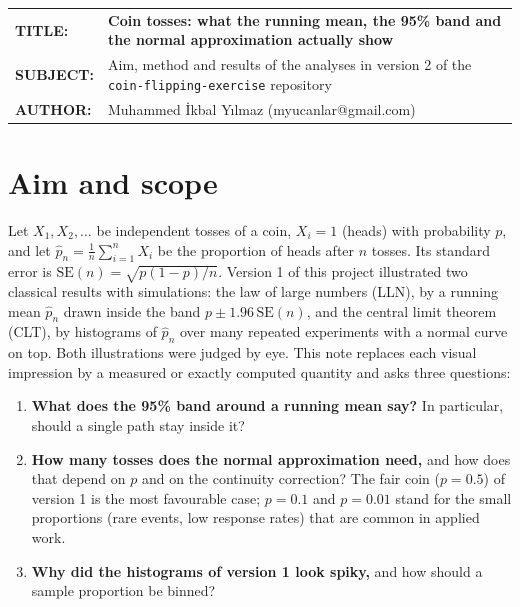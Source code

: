 \documentclass[11pt,a4paper]{article}
\begin{document}
\vspace*{14pt}
\begin{tabular}{@{}p{2.35cm}@{}p{\dimexpr\textwidth-2.35cm}@{}}
\textbf{TITLE:} & \textbf{\large Coin tosses: what the running mean, the 95\% band and the normal approximation actually show}\\[3pt]
\textbf{SUBJECT:} & Aim, method and results of the analyses in version 2 of the \texttt{coin-flipping-exercise} repository\\[3pt]
\textbf{AUTHOR:} & Muhammed İkbal Yılmaz (myucanlar@gmail.com)
\end{tabular}

\vspace{8pt}
\vspace{12pt}

\section{Aim and scope}

Let $X_1, X_2, \dots$ be independent tosses of a coin, $X_i = 1$ (heads) with probability $p$, and let
$\hat p_n = \frac1n\sum_{i=1}^n X_i$ be the proportion of heads after $n$ tosses. Its standard error is
$\mathrm{SE}(n) = \sqrt{p(1-p)/n}$. Version 1 of this project illustrated two classical results with simulations: the law of
large numbers (LLN), by a running mean $\hat p_n$ drawn inside the band $p \pm 1.96\,\mathrm{SE}(n)$, and the central limit
theorem (CLT), by histograms of $\hat p_n$ over many repeated experiments with a normal curve on top. Both illustrations were
judged by eye. This note replaces each visual impression by a measured or exactly computed quantity and asks three questions:

\begin{enumerate}
  \item \textbf{What does the 95\% band around a running mean say?} In particular, should a single path stay inside it?
  \item \textbf{How many tosses does the normal approximation need,} and how does that depend on $p$ and on the continuity
  correction? The fair coin ($p = 0.5$) of version 1 is the most favourable case; $p = 0.1$ and $p = 0.01$ stand for the
  small proportions (rare events, low response rates) that are common in applied work.
  \item \textbf{Why did the histograms of version 1 look spiky,} and how should a sample proportion be binned?
\end{enumerate}
\end{document}

